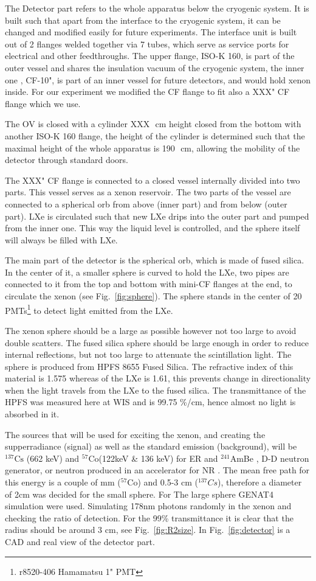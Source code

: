 The Detector part refers to the whole apparatus below the cryogenic system. It is built such that apart from the interface to the cryogenic system, it can be changed and modified easily for future experiments.
The interface unit is built out of 2 flanges welded together via 7 tubes, which serve as service ports for electrical and other feedthroughs. The upper flange, ISO-K 160, is part of the outer vessel and shares the insulation vacuum of the cryogenic system, the inner one , CF-10", is part of an inner vessel for future detectors, and would hold xenon inside. For our experiment we modified the CF flange to fit also a XXX" CF flange which we use.

The OV is closed with a cylinder XXX~\,cm height closed from the bottom with another ISO-K 160 flange, the height of the cylinder is determined such that the maximal height of the whole apparatus is 190~\,cm, allowing the mobility of the detector through standard doors.
 
The XXX" CF flange is connected to a closed vessel internally divided into two parts. This vessel serves as a xenon reservoir. The two parts of the vessel are connected to a spherical orb from above (inner part) and from below (outer part). LXe is circulated such that new LXe drips into the outer part and pumped from the inner one. This way the liquid level is controlled, and the sphere itself will always be filled with LXe. 

The main part of the detector is the spherical orb, which is made of fused silica. In the center of it, a smaller sphere is curved to hold the LXe, two pipes are connected to it from the top and bottom with mini-CF flanges at the end, to circulate the xenon (see Fig.~\ref{fig:sphere}). The sphere stands in the center of 20 PMTs\footnote{r8520-406 Hamamatsu 1" PMT} to detect light emitted from the LXe.

The xenon sphere should be a large as possible however not too large to avoid double scatters. The fused silica sphere should be large enough in order to reduce internal reflections, but not too large to attenuate the scintillation light. The sphere is produced from HPFS 8655 Fused Silica. The refractive index of this material is 1.575 whereas of the LXe is 1.61, this prevents change in directionality when the light travels from the LXe to the fused silica. The transmittance of the HPFS was measured here at WIS and is 99.75 \%/cm, hence almost no light is absorbed in it.

The sources that will be used for exciting the xenon, and creating the supperradiance (signal) as well as the standard emission (background), will be $^{137} \mathrm{Cs}$ (662 keV) and $^{57} \mathrm{Co}$(122keV \& 136 keV) for ER and $^241$AmBe , D-D neutron generator, or neutron produced in an accelerator for NR . The mean free path for this energy is a couple of mm ($^{57} \mathrm{Co}$) and 0.5-3 cm ($^{137} Cs$), therefore a diameter of 2cm was decided for the small sphere. For The large sphere GENAT4 simulation were used. Simulating 178nm photons randomly in the xenon and checking the ratio of detection. For the 99\% transmittance it is clear that the radius should be around 3 cm, see Fig.~\ref{fig:R2size}. In Fig.~\ref{fig:detector} is a CAD and real view of the detector part.


